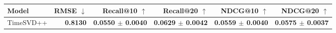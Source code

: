 \begin{tabular}{lrrrrr}
\toprule
Model & RMSE $\downarrow$ & Recall@10 $\uparrow$ & Recall@20 $\uparrow$ & NDCG@10 $\uparrow$ & NDCG@20 $\uparrow$ \\
\midrule
TimeSVD++ & \textbf{0.8130} & \textbf{0.0550 $\pm$ 0.0040} & \textbf{0.0629 $\pm$ 0.0042} & \textbf{0.0559 $\pm$ 0.0040} & \textbf{0.0575 $\pm$ 0.0037} \\
\bottomrule
\end{tabular}
